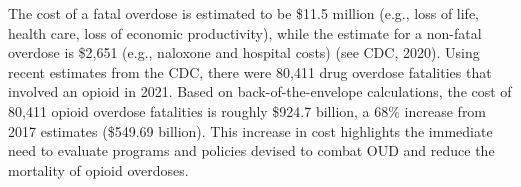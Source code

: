 
The cost of a fatal overdose is estimated to be \$11.5 million (e.g., loss of life, health care, loss of economic productivity), while the estimate for a non-fatal overdose is \$2,651 (e.g., naloxone and hospital costs) (see CDC, 2020). Using recent estimates from the CDC, there were 80,411 drug overdose fatalities that involved an opioid in 2021. Based on back-of-the-envelope calculations, the cost of 80,411 opioid overdose fatalities is roughly \$924.7 billion, a 68\% increase from 2017 estimates (\$549.69 billion). This increase in cost highlights the immediate need to evaluate programs and policies devised to combat OUD and reduce the mortality of opioid overdoses. 

